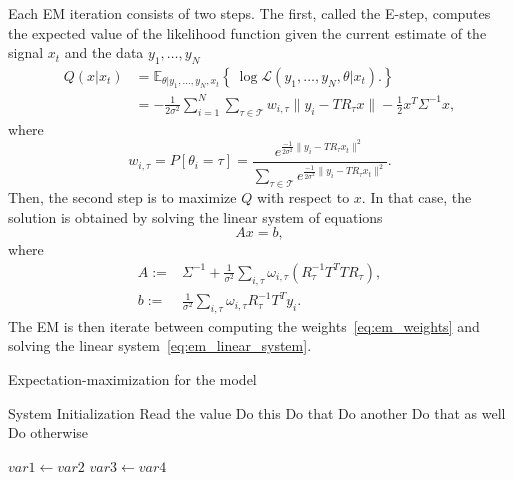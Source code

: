 \documentclass[english,12pt]{article}
\newcommand{\E}{\mathbb{E}}
\numberwithin{equation}{section}
\numberwithin{thm}{section} %
\begin{document}
Each EM iteration consists of two steps.
The first, called the E-step, computes the expected value of the likelihood function  given the current estimate of the signal $x_t$ and the data $y_1,\ldots,y_N$
\begin{equation}
\begin{split}
Q(x|x_t) &= \E_{\theta|y_1,\ldots,y_N,x_t}\left\{\ \log \mathcal{L}(y_1,\ldots,y_N,\theta|x_t).   \right\} \\
& = -\frac{1}{2\sigma^2}\sum_{i=1}^{N}\sum_{\tau\in\mathcal{T}}w_{i,\tau}\|y_i - TR_{\tau}x\| - \frac{1}{2}x^T\Sigma^{-1}x,
\end{split}
\end{equation} 
where 
\begin{equation} \label{eq:em_weights}
w_{i,\tau} = P[\theta_i = \tau] = \frac{e^{\frac{-1}{2\sigma^2}\|y_i-TR_\tau x_t\|^2 }}{\sum_{\tau\in\mathcal{T}}e^{\frac{-1}{2\sigma^2}\|y_i-TR_\tau x_t\|^2 }}.
\end{equation}
Then,  the second step is to maximize $Q$ with respect to $x$. In that case, the solution is obtained by solving the linear system of equations
\begin{equation} \label{eq:em_linear_system}
Ax = b,
\end{equation}
where 
\begin{align}
A :=&  \Sigma^{-1} + \frac{1}{\sigma^2}\sum_{i,\tau}\omega_{i,\tau} (R_\tau^{-1}T^TTR_\tau),\\ 
b :=&   \frac{1}{\sigma^2} \sum_{i,\tau}\omega_{i,\tau}R_\tau^{-1}T^Ty_i.
\end{align}
The EM is then iterate between computing the weights~\eqref{eq:em_weights} and solving the linear system~\eqref{eq:em_linear_system}. 

\begin{algorithm}
	\caption{Expectation-maximization for the model}
	\begin{algorithmic}[1]
		
		       
		\State System Initialization
		\State Read the value 
		\State Do this
		\State Do that
		\State Do another
		\State Do that as well
		\Else
		\State Do otherwise
		\EndIf
		\EndIf
		
		  
		\State $var1 \leftarrow var2$  
		\State $var3 \leftarrow var4$
		\EndWhile  \label{roy's loop}
		\EndProcedure
		
	\end{algorithmic}
\end{algorithm}
\end{document}
